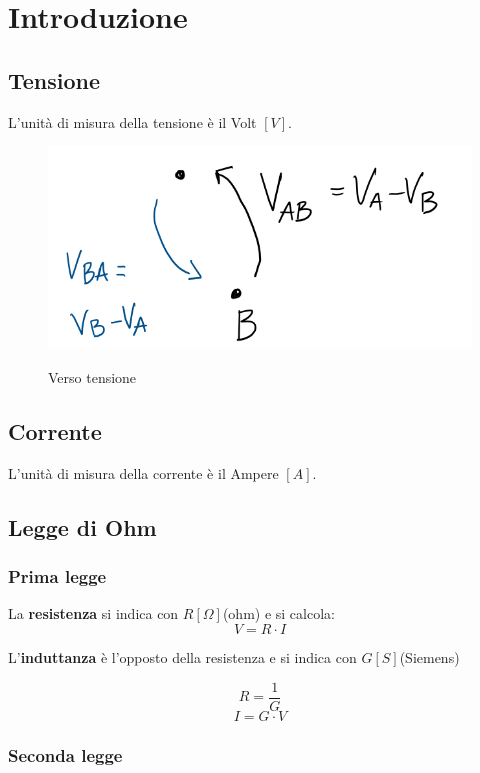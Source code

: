 \section{Introduzione}

\subsection{Tensione}

L'unità di misura della tensione è il Volt $[V]$.


\begin{figure}[H]
    \centering
    \includegraphics[width=0.3\linewidth]{1 - circuiti DC/imgs/Screenshot from 2022-06-09 17-14-50.png}
    \label{fig:tensione}
    \caption{Verso tensione}
\end{figure}

\subsection{Corrente}
L'unità di misura della corrente è il Ampere $[A]$.

\subsection{Legge di Ohm}
\subsubsection*{Prima legge}
La \textbf{resistenza} si indica con $R [\Omega]$(ohm) e si calcola:
\begin{equation*}
    V = R \cdot I
\end{equation*}


L'\textbf{induttanza} è l'opposto della resistenza e si indica con $G [S]$(Siemens)

\begin{equation*}
    R = \frac{1}{G}
\end{equation*}
\begin{equation*}
    I = G \cdot V
\end{equation*}

\subsubsection*{Seconda legge}


